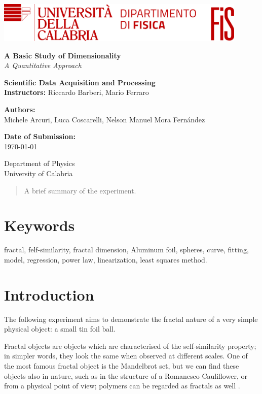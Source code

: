 \documentclass[a4paper,12pt]{article}
\newcommand{\customtitlepage}{
    

    \begin{titlepage}
        \includegraphics[width=0.9\textwidth]{logo.png}\\
        \centering
        \vspace*{1cm}
        
        \Huge\textbf{A Basic Study of Dimensionality}\\
        \vspace{0.5cm}
        \LARGE\textit{A Quantitative Approach}\\
        \vspace{1.5cm}
        
        \textbf{Scientific Data Acquisition and Processing} \\
        \textbf{Instructors:} Riccardo Barberi, Mario Ferraro\\
        \vspace{0.5cm}
        
        \textbf{Authors:}\\
        \large Michele Arcuri, Luca Coscarelli, Nelson Manuel Mora Fernández\\
        \vfill
        
        \large \textbf{Date of Submission:}\\
        \today\\
        \vspace{1.5cm}
        
        \small
        Department of Physics \\
        University of Calabria\\
        \vspace{0.5cm}
    \end{titlepage}
}
\begin{document}
\customtitlepage

\begin{abstract}
    A brief summary of the experiment.
\end{abstract}


\section*{Keywords}
fractal, felf-similarity, fractal dimension, Aluminum foil, spheres, curve, fitting, model, regression, power law, linearization, least squares method.
\newpage

\tableofcontents
\newpage

\section{Introduction}
\par The following experiment aims to demonstrate the fractal nature 
of a very simple physical object: a small tin foil ball. 
 
\par Fractal objects are objects which are characterised of the self-similarity 
property; in simpler words, they look the same when observed at different scales.
One of the most famous fractal object is the Mandelbrot set, but we can find these 
objects also in nature, such as in the structure of a Romanesco Cauliflower, or 
from a physical point of view; polymers can be regarded as fractals as well \cite{rubinstein-2003}.
\end{document}
